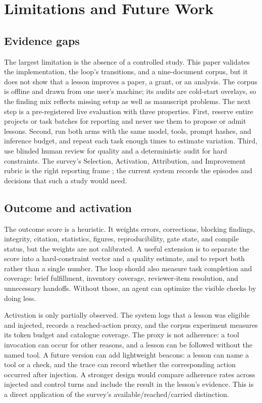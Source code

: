 \section{Limitations and Future Work}
\label{sec:limitations}

\subsection{Evidence gaps}
The largest limitation is the absence of a controlled study. This paper validates the implementation, the loop's transitions, and a nine-document corpus, but it does not show that a lesson improves a paper, a grant, or an analysis. The corpus is offline and drawn from one user's machine; its audits are cold-start overlays, so the finding mix reflects missing setup as well as manuscript problems. The next step is a pre-registered live evaluation with three properties. First, reserve entire projects or task batches for reporting and never use them to propose or admit lessons. Second, run both arms with the same model, tools, prompt hashes, and inference budget, and repeat each task enough times to estimate variation. Third, use blinded human review for quality and a deterministic audit for hard constraints. The survey's Selection, Activation, Attribution, and Improvement rubric is the right reporting frame \citep{wei2026harnessrsi}; the current system records the episodes and decisions that such a study would need.

\subsection{Outcome and activation}
The outcome score is a heuristic. It weights errors, corrections, blocking findings, integrity, citation, statistics, figures, reproducibility, gate state, and compile status, but the weights are not calibrated. A useful extension is to separate the score into a hard-constraint vector and a quality estimate, and to report both rather than a single number. The loop should also measure task completion and coverage: brief fulfillment, inventory coverage, reviewer-item resolution, and unnecessary handoffs. Without those, an agent can optimize the visible checks by doing less.

Activation is only partially observed. The system logs that a lesson was eligible and injected, records a reached-action proxy, and the corpus experiment measures its token budget and catalogue coverage. The proxy is not adherence: a tool invocation can occur for other reasons, and a lesson can be followed without the named tool. A future version can add lightweight beacons: a lesson can name a tool or a check, and the trace can record whether the corresponding action occurred after injection. A stronger design would compare adherence rates across injected and control turns and include the result in the lesson's evidence. This is a direct application of the survey's available/reached/carried distinction.

